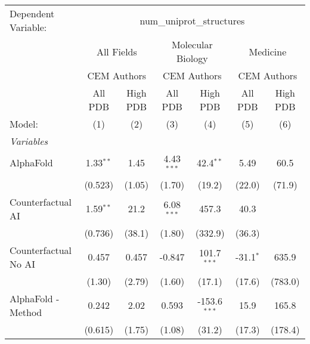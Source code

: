 \begingroup
\centering
\begin{tabular}{lcccccc}
   \tabularnewline \midrule \midrule
   Dependent Variable: & \multicolumn{6}{c}{num\_uniprot\_structures}\\
 & \multicolumn{2}{c}{All Fields} & \multicolumn{2}{c}{Molecular Biology} & \multicolumn{2}{c}{Medicine} \\
\cmidrule(lr){2-3} \cmidrule(lr){4-5} \cmidrule(lr){6-7}
 & \multicolumn{2}{c}{CEM Authors} & \multicolumn{2}{c}{CEM Authors} & \multicolumn{2}{c}{CEM Authors} \\
\cmidrule(lr){2-3} \cmidrule(lr){4-5} \cmidrule(lr){6-7}
 & \multicolumn{1}{c}{All PDB} & \multicolumn{1}{c}{High PDB} & \multicolumn{1}{c}{All PDB} & \multicolumn{1}{c}{High PDB} & \multicolumn{1}{c}{All PDB} & \multicolumn{1}{c}{High PDB} \\
\cmidrule(lr){2-2} \cmidrule(lr){3-3} \cmidrule(lr){4-4} \cmidrule(lr){5-5} \cmidrule(lr){6-6} \cmidrule(lr){7-7}
   Model:                                                     & (1)         & (2)     & (3)          & (4)            & (5)         & (6)\\  
   \midrule
   \emph{Variables}\\
   AlphaFold                                                  & 1.33$^{**}$ & 1.45    & 4.43$^{***}$ & 42.4$^{**}$    & 5.49        & 60.5\\   
                                                              & (0.523)     & (1.05)  & (1.70)       & (19.2)         & (22.0)      & (71.9)\\   
   Counterfactual AI                                          & 1.59$^{**}$ & 21.2    & 6.08$^{***}$ & 457.3          & 40.3        &   \\   
                                                              & (0.736)     & (38.1)  & (1.80)       & (332.9)        & (36.3)      &   \\   
   Counterfactual No AI                                       & 0.457       & 0.457   & -0.847       & 101.7$^{***}$  & -31.1$^{*}$ & 635.9\\   
                                                              & (1.30)      & (2.79)  & (1.60)       & (17.1)         & (17.6)      & (783.0)\\   
   AlphaFold - Method                                         & 0.242       & 2.02    & 0.593        & -153.6$^{***}$ & 15.9        & 165.8\\   
                                                              & (0.615)     & (1.75)  & (1.08)       & (31.2)         & (17.3)      & (178.4)\\   

\end{tabular}

